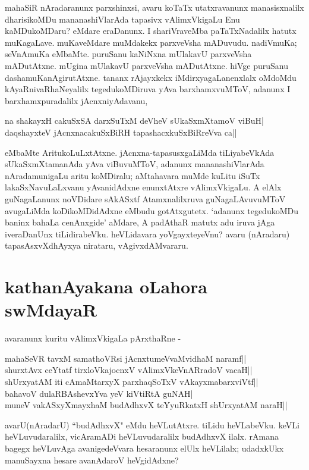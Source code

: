 mahaSiR nAradaranunx parxshinxsi, avaru koTaTx utatxravanunx manasisxnalilx dharisikoMDu mananashiVlarAda tapasivx  vAlimxVkigaLu  Enu kaMDukoMDaru? eMdare eraDanunx. I shariVraveMba paTaTxNadalilx  hatutx muKagaLave. muKaveMdare muMdakekx  parxveVsha mADuvudu. nadiVmuKa; seVnAmuKa eMbaMte. puruSanu kaNiNxna mUlakavU parxveVsha mADutAtxne. mUgina mUlakavU parxveVsha mADutAtxne. hiVge puruSanu dashamuKanAgirutAtxne. tananx rAjayxkekx iMdirxyagaLanenxlalx oMdoMdu kAyaRnivaRhaNeyalilx tegedukoMDiruva yAva barxhamxvuMToV, adanunx I barxhamxpuradalilx jAcnxniyAdavanu,
\begin{shloka}
na shakayxH cakuSxSA darxSuTxM deVheV sUkaSxmXtamoV viBuH|\label{246}\\
daqshayxteV jAcnxnacakuSxBiRH tapashacxkuSxBiRreVva ca|| 
\end{shloka}
eMbaMte AritukoLuLxtAtxne. jAcnxna-tapasusxgaLiMda tiLiyabeVkAda sUkaSxmXtamanAda yAva viBuvuMToV, adanunx mananashiVlarAda nAradamunigaLu aritu koMDiralu; aMtahavara muMde kuLitu iSuTx lakaSxNavuLaLxvanu yAvanidAdxne enunxtAtxre vAlimxVkigaLu. A‌ elAlx guNagaLanunx noVDidare sAkASxtf Atamxnalilxruva guNagaLAvuvuMToV avugaLiMda koDikoMDidAdxne eMbudu gotAtxgutetx. `adanunx tegedukoMDu baninx bahaLa cenAnxgide' aMdare, A padAthaR matutx adu iruva jAga iveraDanUnx tiLidirabeVku. heVLidavara yoVgayxteyeVnu? avaru (nAradaru) tapasAsxvXdhAyxya nirataru, vAgivxdAMvararu.

\section*{kathanAyakana oLahora swMdayaR}

avaranunx kuritu vAlimxVkigaLa pArxthaRne -

\begin{shloka}
mahaSeVR tavxM samathoVR\s si jAcnxtumeVvaMvidhaM naramf||\label{246a}\\
shurxtAvx ceYtatf tirxloVkajocnxV vAlimxVkeVnARradoV vacaH||\label{246b}\\
shUrxyatAM iti cAmaMtarxyX parxhaqSoTxV vAkayxmabarxviVtf||\\
bahavoV dulaRBAshevxYva yeV kiVtiRtA guNAH|\label{247c}\\
muneV vakASxyXmayxhaM budAdhxvX teYyuRkatxH shUrxyatAM naraH||\\
\end{shloka}

avarU(nAradarU) ``budAdhxvX" eMdu heVLutAtxre. tiLidu heVLabeVku. keVLi heVLuvudaralilx, vicAramADi heVLuvudaralilx budAdhxvX ilalx. rAmana bagegx heVLuvAga avanigedeVvara hesaranunx elUlx heVLilalx; udadxkUkx manuSayxna hesare avanAdaroV heVgidAdxne? 

